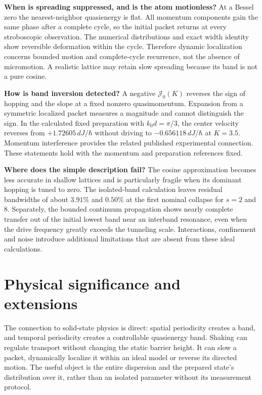 \documentclass[11pt,oneside]{report}
\numberwithin{equation}{chapter}
\begin{document}
\textbf{When is spreading suppressed, and is the atom motionless?} At a Bessel zero the nearest-neighbor quasienergy is flat. All momentum components gain the same phase after a complete cycle, so the initial packet returns at every stroboscopic observation. The numerical distributions and exact width identity show reversible deformation within the cycle. Therefore dynamic localization concerns bounded motion and complete-cycle recurrence, not the absence of micromotion. A realistic lattice may retain slow spreading because its band is not a pure cosine.

\textbf{How is band inversion detected?} A negative $\mathcal J_0(K)$ reverses the sign of hopping and the slope at a fixed nonzero quasimomentum. Expansion from a symmetric localized packet measures a magnitude and cannot distinguish the sign. In the calculated fixed preparation with $k_0d=\pi/3$, the center velocity reverses from $+1.72605\,dJ/\hbar$ without driving to $-0.656118\,dJ/\hbar$ at $K=3.5$. Momentum interference provides the related published experimental connection. These statements hold with the momentum and preparation references fixed.

\textbf{Where does the simple description fail?} The cosine approximation becomes less accurate in shallow lattices and is particularly fragile when its dominant hopping is tuned to zero. The isolated-band calculation leaves residual bandwidths of about $3.91\%$ and $0.50\%$ at the first nominal collapse for $s=2$ and $8$. Separately, the bounded continuum propagation shows nearly complete transfer out of the initial lowest band near an interband resonance, even when the drive frequency greatly exceeds the tunneling scale. Interactions, confinement and noise introduce additional limitations that are absent from these ideal calculations.

\section{Physical significance and extensions}
The connection to solid-state physics is direct: spatial periodicity creates a band, and temporal periodicity creates a controllable quasienergy band. Shaking can regulate transport without changing the static barrier height. It can slow a packet, dynamically localize it within an ideal model or reverse its directed motion. The useful object is the entire dispersion and the prepared state's distribution over it, rather than an isolated parameter without its measurement protocol.
\end{document}
